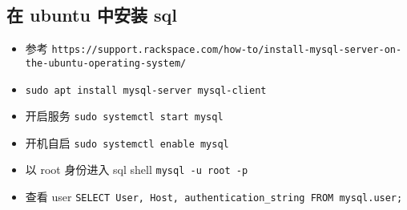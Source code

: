 

\begin{issues}
\issueDraft
\end{issues}

\subsection{在 ubuntu 中安装 sql}
\begin{itemize}
\item 参考 \verb`https://support.rackspace.com/how-to/install-mysql-server-on-the-ubuntu-operating-system/`
\item \verb`sudo apt install mysql-server mysql-client`
\item 开启服务 \verb`sudo systemctl start mysql`
\item 开机自启 \verb`sudo systemctl enable mysql`
\item 以 root 身份进入 sql shell \verb`mysql -u root -p`
\item 查看 user \verb`SELECT User, Host, authentication_string FROM mysql.user;`
\end{itemize}
